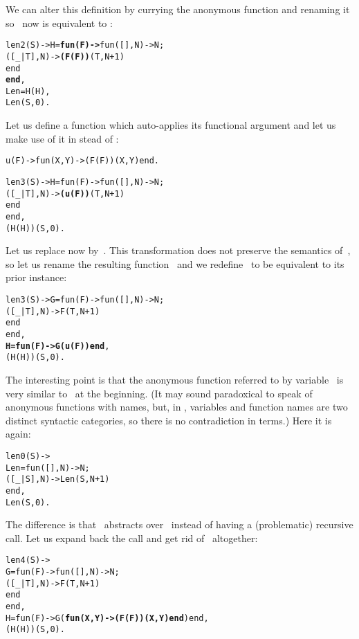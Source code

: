 We can alter this definition by currying the anonymous function and
renaming it so ~now is equivalent to :
\begin{alltt}
len2(S) -> H = \textbf{fun(F) ->} fun(   [],N) -> N;
                            ([\_|T],N) -> \textbf{(F(F))}(T,N+1)
                         end
               \textbf{end},
           Len = H(H),\hfill% \emph{Equivalent to} fun len/2
           Len(S,0).
\end{alltt}
Let us define a function  which auto\hyp{}applies its
functional argument and let us make use of it in stead of
:
\begin{alltt}
u(F) -> fun(X,Y) -> (F(F))(X,Y) end.\hfill% \emph{Self\hyp{}application}

len3(S) -> H = fun(F) -> fun(   [],N) -> N;
                            ([\_|T],N) -> \textbf{(u(F))}(T,N+1)
                         end
               end,
           (H(H))(S,0).\hfill% \emph{Expanded} Len
\end{alltt}
Let us replace now  by~. This transformation
does not preserve the semantics of~, so let us rename the
resulting function~ and we redefine~ to be
equivalent to its prior instance:
\begin{alltt}
len3(S) -> G = fun(F) -> fun(   [],N) -> N;
                            ([\_|T],N) -> F(T,N+1)
                         end
               end,
           \textbf{H = fun(F) -> G(u(F)) end},
           (H(H))(S,0).
\end{alltt}
The interesting point is that the anonymous function referred to by
variable~ is very similar to~ at the
beginning. (It may sound paradoxical to speak of anonymous functions
with names, but, in \Erlang, variables and function names are two
distinct syntactic categories, so there is no contradiction in terms.)
Here it is again:
\begin{alltt}
len0(S) -> 
  Len = fun(   [],N) -> N;
           ([\_|S],N) -> Len(S,N+1)\hfill% \emph{Unfortunately invalid}
        end,
  Len(S,0).
\end{alltt}
The difference is that ~abstracts over~ instead
of having a (problematic) recursive call. Let us expand back the call
 and get rid of~ altogether:
\begin{alltt}
len4(S) ->
  G = fun(F) -> fun(   [],N) -> N;
                   ([\_|T],N) -> F(T,N+1)
                end
      end,
  H = fun(F) -> G(\textbf{fun(X,Y) -> (F(F))(X,Y) end}) end,
  (H(H))(S,0).
\end{alltt}

